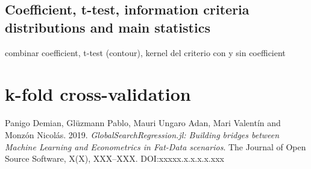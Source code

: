 \documentclass{article}
\begin{document}
\subsection{Coefficient, t-test, information criteria distributions and main statistics}

combinar coefficient, t-test (contour), kernel del criterio con y sin coefficient

\section{k-fold cross-validation}


  
\begin{thebibliography}{1}

Panigo Demian, Glüzmann Pablo, Mauri Ungaro Adan, Mari Valentín and Monzón Nicolás. 2019.
\newblock \textit{GlobalSearchRegression.jl: Building bridges between Machine Learning and Econometrics in Fat-Data scenarios}.
\newblock The Journal of Open Source Software, X(X), XXX--XXX. DOI:xxxxx.x.x.x.x.xxx

\end{thebibliography}
\end{document}
